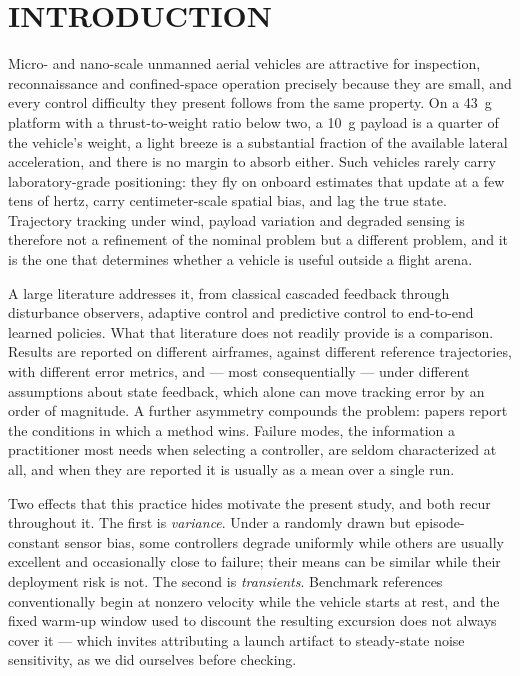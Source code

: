 \section{INTRODUCTION}
\label{sec:intro}

Micro- and nano-scale unmanned aerial vehicles are attractive for inspection,
reconnaissance and confined-space operation precisely because they are small, and every
control difficulty they present follows from the same property. On a \SI{43}{\gram}
platform with a thrust-to-weight ratio below two, a \SI{10}{\gram} payload is a quarter
of the vehicle's weight, a light breeze is a substantial fraction of the available
lateral acceleration, and there is no margin to absorb either. Such vehicles rarely
carry laboratory-grade positioning: they fly on onboard estimates that update at a few
tens of hertz, carry centimeter-scale spatial bias, and lag the true state. Trajectory
tracking under wind, payload variation and degraded sensing is therefore not a
refinement of the nominal problem but a different problem, and it is the one that
determines whether a vehicle is useful outside a flight arena.

A large literature addresses it, from classical cascaded feedback through disturbance
observers, adaptive control and predictive control to end-to-end learned policies. What
that literature does not readily provide is a comparison. Results are reported on
different airframes, against different reference trajectories, with different error
metrics, and --- most consequentially --- under different assumptions about state
feedback, which alone can move tracking error by an order of magnitude. A further
asymmetry compounds the problem: papers report the conditions in which a method wins.
Failure modes, the information a practitioner most needs when selecting a controller,
are seldom characterized at all, and when they are reported it is usually as a mean over
a single run.

Two effects that this practice hides motivate the present study, and both recur
throughout it. The first is \emph{variance}. Under a randomly drawn but
episode-constant sensor bias, some controllers degrade uniformly while others are
usually excellent and occasionally close to failure; their means can be similar while
their deployment risk is not. The second is \emph{transients}. Benchmark references
conventionally begin at nonzero velocity while the vehicle starts at rest, and the fixed
warm-up window used to discount the resulting excursion does not always cover it ---
which invites attributing a launch artifact to steady-state noise sensitivity, as we
did ourselves before checking.

